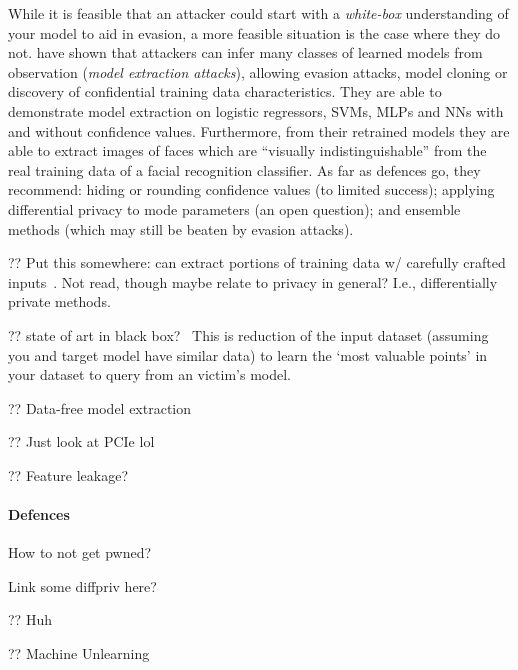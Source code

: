 While it is feasible that an attacker could start with a \emph{white-box} understanding of your model to aid in evasion, a more feasible situation is the case where they do not.
\textcite{DBLP:conf/uss/TramerZJRR16} have shown that attackers can infer many classes of learned models from observation (\emph{model extraction attacks}), allowing evasion attacks, model cloning or discovery of confidential training data characteristics.
They are able to demonstrate model extraction on logistic regressors, SVMs, MLPs and NNs with and without confidence values.
Furthermore, from their retrained models they are able to extract images of faces which are ``visually indistinguishable'' from the real training data of a facial recognition classifier.
As far as defences go, they recommend: hiding or rounding confidence values (to limited success); applying differential privacy to mode parameters (an open question); and ensemble methods (which may still be beaten by evasion attacks).

?? Put this somewhere: can extract portions of training data w/ carefully crafted inputs~\parencite{DBLP:journals/corr/abs-2012-07805}. Not read, though maybe relate to privacy in general? I.e., differentially private methods.

?? state of art in black box?~\parencite{DBLP:conf/uss/HeM0HH21}
This is reduction of the input dataset (assuming you and target model have similar data) to learn the `most valuable points' in your dataset to query from an victim's model.

?? Data-free model extraction~\parencite{DBLP:conf/cvpr/TruongMWP21}

?? Just look at PCIe lol~\parencite{DBLP:conf/uss/ZhuCZL21}

?? Feature leakage?~\parencite{DBLP:conf/sp/MelisSCS19}

\paragraph{Defences}
How to not get pwned?

Link some diffpriv here?

?? Huh~\parencite{DBLP:journals/corr/abs-2103-07101}

?? Machine Unlearning~\parencite{DBLP:conf/sp/BourtouleCCJTZL21}
